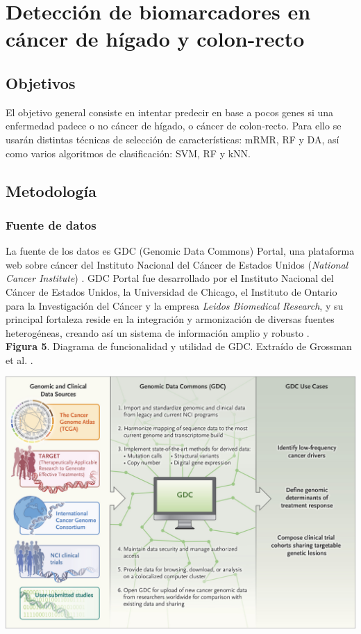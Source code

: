 \chapter{Detección de biomarcadores en cáncer de hígado y colon-recto}

\section{Objetivos}

El objetivo general consiste en intentar predecir en base a pocos genes si una enfermedad padece o no cáncer de hígado, o cáncer de colon-recto. Para ello se usarán distintas técnicas de selección de características: mRMR, RF y DA, así como varios algoritmos de clasificación: SVM, RF y kNN.

\section{Metodología}

\subsection{Fuente de datos}

La fuente de los datos es GDC (Genomic Data Commons) Portal, una plataforma web sobre cáncer del Instituto Nacional del Cáncer de Estados Unidos (\textit{National Cancer Institute}) \cite{GDCPortal, NationalCancerInstitute}. GDC Portal fue desarrollado por el Instituto Nacional del Cáncer de Estados Unidos, la Universidad de Chicago, el Instituto de Ontario para la Investigación del Cáncer y la empresa \textit{Leidos Biomedical Research}, y su principal fortaleza reside en la integración y armonización de diversas fuentes heterogéneas, creando así un sistema de información amplio y robusto \cite{Grossman2016}. \\

\newpage
\textbf{Figura 5}. Diagrama de funcionalidad y utilidad de GDC. Extraído de Grossman et al. \cite{Grossman2016}.
\begin{center}
	\includegraphics[width=1\textwidth]{figuras/05_funcionamiento_gdc.jpeg} \\
\end{center}

